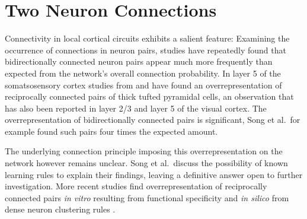 \newpage

\section{Two Neuron Connections}


Connectivity in local cortical circuits exhibits a salient feature:
Examining the occurrence of connections in neuron pairs, studies have
repeatedly found that bidirectionally connected neuron pairs appear
much more frequently than expected from the network's overall
connection probability. In layer 5 of the somatsosensory cortex
studies from \textcite{Markram1997_TL5} and \textcite{Perin2011} have
found an overrepresentation of reciprocally connected pairs of thick
tufted pyramidal cells, an observation that has also been reported in
layer 2/3 \parencite{Holmgren2003} and layer 5 \parencite{Song2005} of
the visual cortex. The overrepresentation of bidirectionally connected
pairs is significant, Song et al.~for example found such pairs four times the
expected amount. 

The underlying connection principle imposing this overrepresentation
on the network however remains unclear. Song et al.~discuss the
possibility of known learning rules to explain their findings, leaving
a definitive answer open to further investigation. More recent studies
find overrepresentation of reciprocally connected pairs \textit{in
  vitro} resulting from functional specificity \parencite{Ko2011} and
\textit{in silico} from dense neuron clustering
rules \parencite{Klinshove2014}. 

